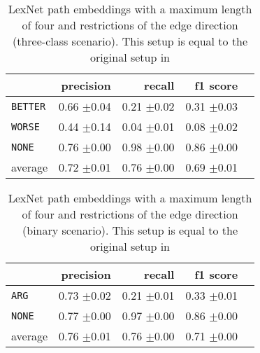 	
	\begin{table}[htbp] 
		\centering 
		\caption{LexNet path embeddings with a maximum length of four and restrictions of the edge direction (three-class scenario). This setup is equal to the original setup in \cite{DBLP:journals/corr/ShwartzD16}} 
		\label{  }
		\begin{tabular}{@{}lrrrr@{}}
			\toprule
			        & precision                & recall                   & f1 score                 \\ \midrule 
\texttt	{BETTER}	&	 0.66 \scriptsize{$\pm$0.04} &	 0.21 \scriptsize{$\pm$0.02} &	 0.31 \scriptsize{$\pm$0.03}  \\ 
\texttt	{WORSE}	&	 0.44 \scriptsize{$\pm$0.14} &	 0.04 \scriptsize{$\pm$0.01} &	 0.08 \scriptsize{$\pm$0.02}  \\ 
\texttt	{NONE}	&	 0.76 \scriptsize{$\pm$0.00} &	 0.98 \scriptsize{$\pm$0.00} &	 0.86 \scriptsize{$\pm$0.00}  \\ 
average	&	 0.72 \scriptsize{$\pm$0.01} &	 0.76 \scriptsize{$\pm$0.00} &	 0.69 \scriptsize{$\pm$0.01}  \\ 
			\bottomrule
		\end{tabular}
	\end{table}
	
	\begin{table}[htbp] 
		\centering 
		\caption{LexNet path embeddings with a maximum length of four and restrictions of the edge direction (binary scenario). This setup is equal to the original setup in \cite{DBLP:journals/corr/ShwartzD16}} 
		\label{  }
		\begin{tabular}{@{}lrrrr@{}}
			\toprule
			        & precision                & recall                   & f1 score                 \\ \midrule 
	\texttt{ARG}	&	 0.73 \scriptsize{$\pm$0.02} &	 0.21 \scriptsize{$\pm$0.01} &	 0.33 \scriptsize{$\pm$0.01}  \\ 
	\texttt{NONE}	&	 0.77 \scriptsize{$\pm$0.00} &	 0.97 \scriptsize{$\pm$0.00} &	 0.86 \scriptsize{$\pm$0.00}  \\ 
average	&	 0.76 \scriptsize{$\pm$0.01} &	 0.76 \scriptsize{$\pm$0.00} &	 0.71 \scriptsize{$\pm$0.00}  \\ 
			\bottomrule
		\end{tabular}
	\end{table}
	
